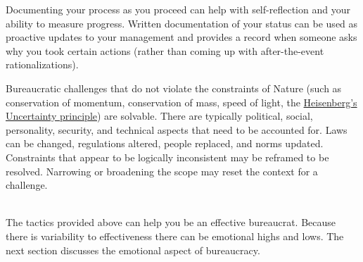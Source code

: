 Documenting your process as you proceed can help with self-reflection and your ability to measure progress. Written documentation of your status can be used as proactive updates to your management and provides a record when someone asks  why you took certain actions (rather than coming up with after-the-event rationalizations).

Bureaucratic challenges that do not violate the constraints of Nature (such as conservation of momentum, conservation of mass, speed of light, the \href{https://en.wikipedia.org/wiki/Uncertainty_principle}{Heisenberg's Uncertainty principle}) 
are solvable. There are typically political, social, personality, security, and technical aspects that need to be accounted for. Laws can be changed, regulations altered, people replaced, and norms updated. Constraints that appear to be logically inconsistent may be reframed to be resolved. Narrowing or broadening the scope may reset the context for a challenge.

\ \\


The tactics provided above can help you be an effective bureaucrat. Because there is variability to effectiveness there can be emotional highs and lows. The next section discusses the emotional aspect of bureaucracy.
